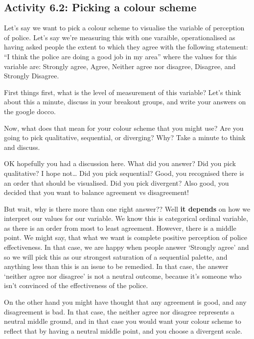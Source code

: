 \documentclass[
]{book}
\begin{document}
\hypertarget{activity-6.2-picking-a-colour-scheme}{%
\subsection{Activity 6.2: Picking a colour scheme}\label{activity-6.2-picking-a-colour-scheme}}

Let's say we want to pick a colour scheme to visualise the variable of perception of police. Let's say we're measuring this with one varaible, operationalised as having asked people the extent to which they agree with the following statement: ``I think the police are doing a good job in my area'' where the values for this variable are: Strongly agree, Agree, Neither agree nor disagree, Disagree, and Strongly Disagree.

First things first, what is the level of measurement of this variable? Let's think about this a minute, discuss in your breakout groups, and write your answers on the google docco.

Now, what does that mean for your colour scheme that you might use? Are you going to pick qualitative, sequential, or diverging? Why? Take a minute to think and discuss.

OK hopefully you had a discussion here. What did you answer? Did you pick qualitative? I hope not\ldots{} Did you pick sequential? Good, you recognised there is an order that should be visualised. Did you pick divergent? Also good, you decided that you want to balance agreement vs disagreement!

But wait, why is there more than one right answer?? Well \textbf{it depends} on how we interpret our values for our variable. We know this is categorical ordinal variable, as there is an order from most to least agreement. However, there is a middle point. We might say, that what we want is complete positive perception of police effectiveness. In that case, we are happy when people answer `Strongly agree' and so we will pick this as our strongest saturation of a sequential palette, and anything less than this is an issue to be remedied. In that case, the answer `neither agree nor disagree' is not a neutral outcome, because it's someone who isn't convinced of the effectiveness of the police.

On the other hand you might have thought that any agreement is good, and any disagreement is bad. In that case, the neither agree nor disagree represents a neutral middle ground, and in that case you would want your colour scheme to reflect that by having a neutral middle point, and you choose a divergent scale.
\end{document}
